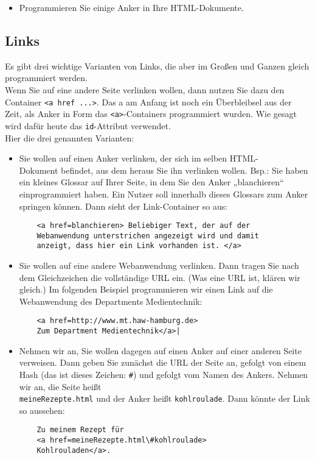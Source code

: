 \begin{itemize}
	\item Programmieren Sie einige Anker in Ihre HTML-Dokumente.
\end{itemize}

\subsection{Links}

Es gibt drei wichtige Varianten von Links, die aber im Großen und Ganzen gleich programmiert werden.\\

Wenn Sie auf eine andere Seite verlinken wollen, dann nutzen Sie dazu den Container \verb|<a href ...>|. Das a am Anfang ist noch ein Überbleibsel aus der Zeit, als Anker in Form das \verb|<a>|-Containers programmiert wurden. Wie gesagt wird dafür heute das \verb|id|-Attribut verwendet.\\

Hier die drei genannten Varianten:

\begin{itemize}
	\item Sie wollen auf einen Anker verlinken, der sich im selben HTML-\\Dokument befindet, aus dem heraus Sie ihn verlinken wollen. Bsp.: Sie haben ein kleines Glossar auf Ihrer Seite, in dem Sie den Anker „blanchieren“ einprogrammiert haben. Ein Nutzer soll innerhalb dieses Glossars zum Anker springen können. Dann sieht der Link-Container so aus:
	\begin{verbatim}
	<a href=blanchieren> Beliebiger Text, der auf der 
	Webanwendung unterstrichen angezeigt wird und damit 
	anzeigt, dass hier ein Link vorhanden ist. </a>
	\end{verbatim}
	\item Sie wollen auf eine andere Webanwendung verlinken. Dann tragen Sie nach dem Gleichzeichen die vollständige URL ein. (Was eine URL ist, klären wir gleich.) Im folgenden Beispiel programmieren wir einen Link auf die Webanwendung des Departments Medientechnik:
	\begin{verbatim}	
	<a href=http://www.mt.haw-hamburg.de>
	Zum Department Medientechnik</a>|
	\end{verbatim}
	\item Nehmen wir an, Sie wollen dagegen auf einen Anker auf einer anderen Seite verweisen. Dann geben Sie zunächst die URL der Seite an, gefolgt von einem Hash (das ist dieses Zeichen: \verb|#|) und gefolgt vom Namen des Ankers. Nehmen wir an, die Seite heißt\\ \verb|meineRezepte.html| und der Anker heißt \verb|kohlroulade|. Dann könnte der Link so aussehen:
	\begin{verbatim}
	Zu meinem Rezept für 
	<a href=meineRezepte.html\#kohlroulade>
	Kohlrouladen</a>.
	\end{verbatim}
\end{itemize}

